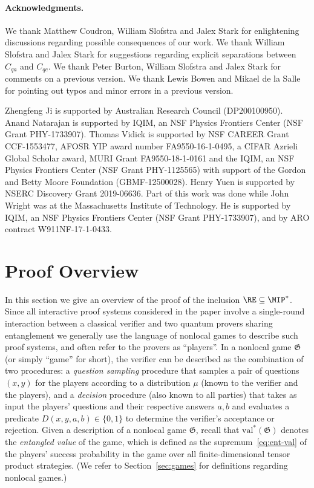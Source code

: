 \documentclass[11pt]{article}
\theoremstyle{definition}
\newcommand{\val}{\ensuremath{\mathrm{val}}}
\newcommand{\game}{\mathfrak{G}}
\begin{document}
\paragraph{Acknowledgments.} We thank Matthew Coudron, William Slofstra and Jalex Stark for enlightening discussions regarding possible consequences of our work. We thank William Slofstra and Jalex Stark for suggestions regarding explicit separations between $C_{qa}$ and $C_{qc}$. We thank Peter Burton, William Slofstra and Jalex Stark for comments on a previous version. We thank Lewis Bowen and Mikael de la Salle for pointing out typos and minor errors in a previous version.

Zhengfeng Ji is supported by Australian Research Council (DP200100950). Anand Natarajan is supported by IQIM, an NSF Physics Frontiers Center (NSF Grant PHY-1733907). Thomas Vidick is supported by NSF CAREER Grant CCF-1553477, AFOSR YIP award number FA9550-16-1-0495, a CIFAR Azrieli Global Scholar award, MURI Grant FA9550-18-1-0161 and the IQIM, an NSF Physics Frontiers Center (NSF Grant PHY-1125565) with support of the Gordon and Betty Moore Foundation (GBMF-12500028). Henry Yuen is supported by NSERC Discovery Grant 2019-06636.
Part of this work was done while John Wright was at the Massachusetts Institute of Technology.
He is supported by IQIM, an NSF Physics Frontiers Center (NSF Grant PHY-1733907), and by ARO contract W911NF-17-1-0433.



 
\section{Proof Overview}
\label{sec:overview}

In this section we give an overview of the proof of the inclusion $\RE \subseteq \MIP^*$. Since all interactive proof systems considered in the paper involve a single-round interaction between a classical verifier and two quantum provers sharing entanglement we generally use the language of nonlocal games to describe such proof systems, and often refer to the provers as ``players''. In a nonlocal game $\game$ (or simply ``game'' for short), the verifier can be described as the combination of two procedures: a \emph{question sampling} procedure that samples a pair of questions $(x,y)$ for the players according to a distribution $\mu$ (known to the verifier and the players), and a \emph{decision} procedure (also known to all parties) that takes as input the players' questions and their respective answers $a,b$ and evaluates a predicate $D(x,y,a,b)\in \{0,1\}$ to determine the verifier's acceptance or rejection. Given a description of a nonlocal game $\game$, recall that $\val^*(\game)$ denotes the \emph{entangled value} of the game, which is defined as the supremum~\eqref{eq:ent-val} of the players' success probability in the game over all finite-dimensional tensor product strategies. (We refer to Section~\ref{sec:games} for definitions regarding nonlocal games.) 
\end{document}
